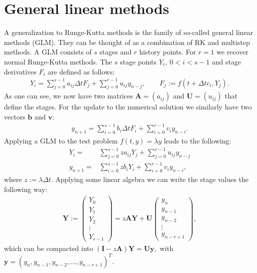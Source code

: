 \documentclass[10pt,a4paper]{article}
\newcommand{\bvec}[1]{\mathbf{#1}}
\begin{document}
\section{General linear methods}
A generalization to Runge-Kutta methods is the family of so-called general linear methods (GLM).
They can be thought of as a combination of RK and multistep methods.
A GLM consists of $s$ stages and $r$ history points. For $r=1$ we recover normal Runge-Kutta methods.
The $s$ stage points $Y_i,~0<i<s-1$ and stage derivatives $F_i$ are defined as follows:
\begin{align*}
  Y_i = \sum_{j=0}^{s-1} a_{ij}\Delta t F_j + \sum_{j=0}^{r-1}u_{ij} y_{n-j}, \qquad F_j := f(t+\Delta t c_i, Y_j).
\end{align*}
As one can see, we now have two matrices $\bvec{A} = (a_{ij})$ and $\bvec{U} = (u_{ij})$ that define the stages.
For the update to the numerical solution we similarly have two vectors $\bvec{b}$ and $\bvec{v}$:
\begin{align*}
  y_{n+1} = \sum_{i=0}^{s-1} b_i\Delta t F_i + \sum_{i=0}^{r-1}v_i y_{n-i}.
\end{align*}
Applying a GLM to the test problem $f(t,y) = \lambda y$ leads to the following:
\begin{align*}
  Y_i =& \sum_{j=0}^{s-1} z a_{ij} Y_j + \sum_{j=0}^{r-1} u_{ij}y_{n-j} \\
  y_{n+1} =& \sum_{i=0}^{s-1} z b_i Y_i + \sum_{i=0}^{r-1} v_iy_{n-i},
\end{align*}
where $z:=\lambda \Delta t.$
Applying some linear algebra we can write the stage values the following way:
\begin{align*}
  \bvec{Y} := \begin{pmatrix}
    Y_0 \\
    Y_1 \\
    Y_2 \\
    \vdots \\
    Y_{s-1}
  \end{pmatrix} = z \bvec{A} \bvec{Y} + \bvec{U}\begin{pmatrix}
    y_n \\
    y_{n-1} \\
    y_{n-2} \\
    \vdots \\
    y_{n-r+1}
  \end{pmatrix},
\end{align*}
which can be compacted into $(\bvec{I} - z \bvec{A})\bvec{Y} = \bvec{U} \bvec{y},$ with $\bvec{y} = (y_n, y_{n-1}, y_{n-2}, \hdots, y_{n-r+1})^T.$
\end{document}
